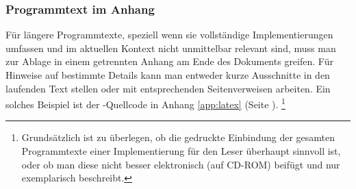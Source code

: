 \subsubsection{Programmtext im Anhang}

Für längere Programmtexte, speziell wenn sie vollständige
Implementierungen umfassen und im aktuellen Kontext nicht
unmittelbar relevant sind, muss man zur Ablage in einem getrennten
Anhang am Ende des Dokuments greifen. Für Hinweise auf bestimmte
Details kann man entweder kurze Ausschnitte in den laufenden Text
stellen oder mit entsprechenden Seitenverweisen arbeiten. Ein
solches Beispiel ist der \latex-Quellcode in Anhang
\ref{app:latex} (Seite \pageref{app:latex}).%
\footnote{%
Grundsätzlich ist zu überlegen, ob die gedruckte Einbindung der gesamten
Programmtexte einer Implementierung für den Leser überhaupt sinnvoll ist, oder
ob man diese nicht besser elektronisch (auf CD-ROM) beifügt und nur exemplarisch
beschreibt.}